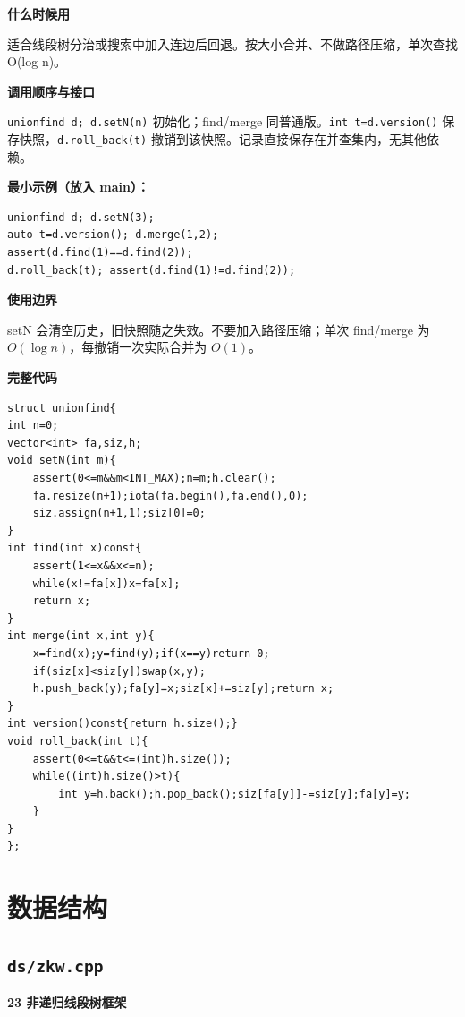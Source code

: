 \documentclass[UTF8,a4paper,10pt]{ctexart}
\newcommand{\TemplUsage}[1]{\textbf{什么时候用}\par #1\par}
\newcommand{\TemplApi}[1]{\textbf{调用顺序与接口}\par #1\par}
\newcommand{\TemplNote}[1]{\textbf{使用边界}\par #1\par}
\begin{document}
\TemplUsage{适合线段树分治或搜索中加入连边后回退。按大小合并、不做路径压缩，单次查找 O(log n)。}
\TemplApi{\texttt{unionfind d; d.setN(n)} 初始化；find/merge 同普通版。\texttt{int t=d.version()} 保存快照，\texttt{d.roll\_back(t)} 撤销到该快照。记录直接保存在并查集内，无其他依赖。}

\textbf{最小示例（放入 main）：}
\begin{lstlisting}
unionfind d; d.setN(3);
auto t=d.version(); d.merge(1,2);
assert(d.find(1)==d.find(2));
d.roll_back(t); assert(d.find(1)!=d.find(2));
\end{lstlisting}
\TemplNote{setN 会清空历史，旧快照随之失效。不要加入路径压缩；单次 find/merge 为 $O(\log n)$，每撤销一次实际合并为 $O(1)$。}
\textbf{完整代码}
\begin{lstlisting}[firstnumber=1]
struct unionfind{
int n=0;
vector<int> fa,siz,h;
void setN(int m){
	assert(0<=m&&m<INT_MAX);n=m;h.clear();
	fa.resize(n+1);iota(fa.begin(),fa.end(),0);
	siz.assign(n+1,1);siz[0]=0;
}
int find(int x)const{
	assert(1<=x&&x<=n);
	while(x!=fa[x])x=fa[x];
	return x;
}
int merge(int x,int y){
	x=find(x);y=find(y);if(x==y)return 0;
	if(siz[x]<siz[y])swap(x,y);
	h.push_back(y);fa[y]=x;siz[x]+=siz[y];return x;
}
int version()const{return h.size();}
void roll_back(int t){
	assert(0<=t&&t<=(int)h.size());
	while((int)h.size()>t){
		int y=h.back();h.pop_back();siz[fa[y]]-=siz[y];fa[y]=y;
	}
}
};
\end{lstlisting}
\par\vspace{1em}
\clearpage
\section{数据结构}
\subsection{\texttt{ds/zkw.cpp}}
\textbf{23 非递归线段树框架}
\end{document}
